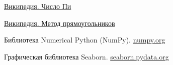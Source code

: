 \documentclass[a4paper,12pt]{article}
\begin{document}
\begin{thebibliography}{9}

    \href{https://ru.wikipedia.org/wiki/%D0%9F%D0%B8_(%D1%87%D0%B8%D1%81%D0%BB%D0%BE)}{Википедия. Число Пи}  

    \href{https://ru.wikipedia.org/wiki/%D0%9C%D0%B5%D1%82%D0%BE%D0%B4_%D0%BF%D1%80%D1%8F%D0%BC%D0%BE%D1%83%D0%B3%D0%BE%D0%BB%D1%8C%D0%BD%D0%B8%D0%BA%D0%BE%D0%B2}{Википедия. Метод прямоугольников}

    Библиотека Numerical Python (NumPy). \href{https://numpy.org/}{numpy.org}

    Графическая библиотека Seaborn. \href{https://seaborn.pydata.org/generated/seaborn.lineplot.html}{seaborn.pydata.org}
\end{thebibliography}
\end{document}
